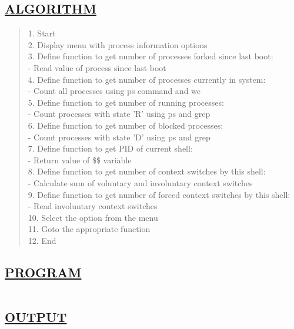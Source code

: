 \documentclass[a4paper, 12pt]{article}
\begin{document}
\subsection*{\underline{ALGORITHM}}
\begin{quote}
1. Start\\
2. Display menu with process information options\\
3. Define function to get number of processes forked since last boot:\\
   - Read value of process since last boot\\
4. Define function to get number of processes currently in system:\\
   - Count all processes using ps command and wc\\
5. Define function to get number of running processes:\\
   - Count processes with state 'R' using ps and grep\\
6. Define function to get number of blocked processes:\\
   - Count processes with state 'D' using ps and grep\\
7. Define function to get PID of current shell:\\
   - Return value of \$\$ variable\\
8. Define function to get number of context switches by this shell:\\
   - Calculate sum of voluntary and involuntary context switches\\
9. Define function to get number of forced context switches by this shell:\\
   - Read involuntary context switches\\
10. Select the option from the menu\\
11. Goto the appropriate function\\
12. End\\
\end{quote}

\subsection*{\underline{PROGRAM}}
\begin{quote}
\inputminted[fontsize=\small,breaklines,breakanywhere]{sh}{shell1.sh}%
\end{quote}

\newpage

\subsection*{\underline{OUTPUT}}
\end{document}
